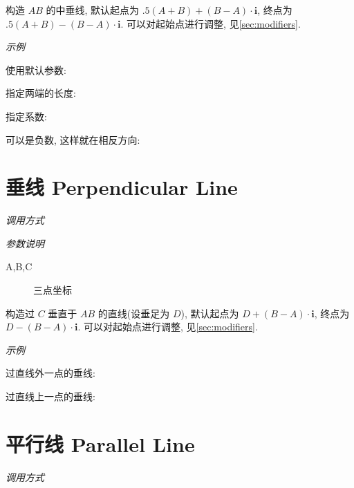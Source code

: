 构造 $AB$ 的中垂线, 默认起点为 $.5(A+B)+(B-A) \cdot \mathbf{i}$, 终点为 $.5(A+B)-(B-A) \cdot \mathbf{i}$.
可以对起始点进行调整, 见\ref{sec:modifiers}.

\emph{示例}

使用默认参数:


指定两端的长度:


指定系数:


可以是负数, 这样就在相反方向:


\section{垂线 Perpendicular Line}

\emph{调用方式}

\begin{tcolorbox}{}
\end{tcolorbox}

\emph{参数说明}

\begin{description}
  \item[A,B,C] 三点坐标 
\end{description}

构造过 $C$ 垂直于 $AB$ 的直线(设垂足为 $D$), 默认起点为 $D+(B-A) \cdot \mathbf{i}$, 终点为 $D-(B-A) \cdot \mathbf{i}$.
可以对起始点进行调整, 见\ref{sec:modifiers}.

\emph{示例}

过直线外一点的垂线:


过直线上一点的垂线:


\section{平行线 Parallel Line}

\emph{调用方式}

\begin{tcolorbox}{}
\end{tcolorbox}

